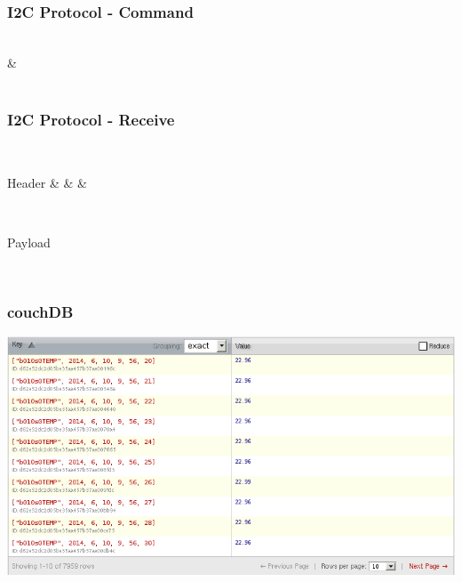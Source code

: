\documentclass[t]{beamer}
\begin{document}
\begin{frame}[c,fragile]
    \frametitle{I2C Protocol - Command}
  \begin{center}
	\begin{bytefield}[endianness=big, bitwidth=2em]{8}
		\\
		 &
		\\
		\\
	\end{bytefield}
  \end{center}
\end{frame}
\begin{frame}[c,fragile]
    \frametitle{I2C Protocol - Receive}
  \begin{center}
		\begin{bytefield}[endianness=big, bitwidth=2.1em]{8}
		\\
		\begin{rightwordgroup}{Header}
			 &  &  & 
		\end{rightwordgroup}\\
		\begin{rightwordgroup}{Payload}
			\\
		\end{rightwordgroup}\\
	\end{bytefield}
  \end{center}
\end{frame}
\begin{frame}[c]
    \frametitle{couchDB}
  \begin{center}
  	\includegraphics[width=0.9\linewidth]{img/db1.png}\\
  \vspace{0.5cm}
  \end{center}
    
\end{frame}
\end{document}
